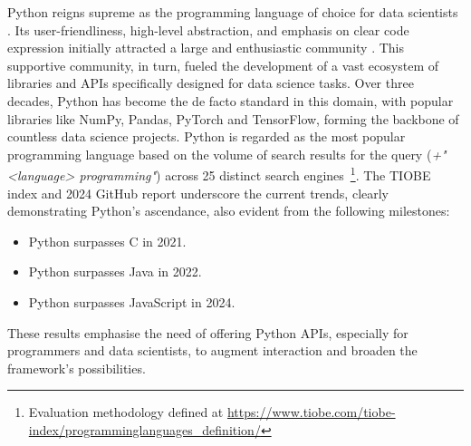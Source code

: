 Python reigns supreme as the programming language of choice for data scientists \cite{Python_CS-R9526}. Its user-friendliness, high-level abstraction, and emphasis on clear code expression initially attracted a large and enthusiastic community \cite{StackOverflowDeveloper}. This supportive community, in turn, fueled the development of a vast ecosystem of libraries and \glspl{API} specifically designed for data science tasks. Over three decades, Python has become the de facto standard in this domain, with popular libraries like NumPy, Pandas, PyTorch and TensorFlow, forming the backbone of countless data science projects. Python is regarded as the most popular programming language based on the volume of search results for the query (\textit{+"<language> programming"}) across 25 distinct search engines~\footnote{Evaluation methodology defined at \url{https://www.tiobe.com/tiobe-index/programminglanguages_definition/}}. The TIOBE index \cite{TIOBEIndex} and 2024 GitHub report \cite{PythonTopLanguage} underscore the current trends, clearly demonstrating Python's ascendance, also evident from the following milestones:
\begin{itemize}
    \item Python surpasses C in 2021.
    \item Python surpasses Java in 2022.
    \item Python surpasses JavaScript in 2024.
\end{itemize}
These results emphasise the need of offering Python \glspl{API}, especially for programmers and data scientists, to augment interaction and broaden the framework's possibilities.